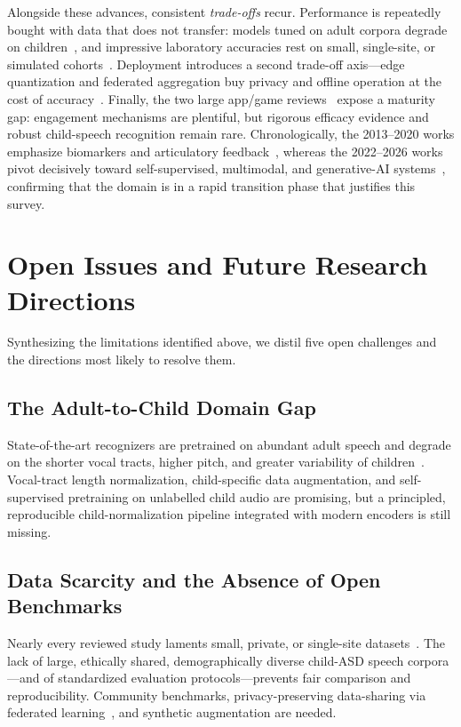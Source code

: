 \documentclass[conference]{IEEEtran}
\begin{document}
Alongside these advances, consistent \emph{trade-offs} recur. Performance is repeatedly bought with data that does not transfer: models tuned on adult corpora degrade on children~\cite{ref1}, and impressive laboratory accuracies rest on small, single-site, or simulated cohorts~\cite{ref6,ref10,ref11}. Deployment introduces a second trade-off axis---edge quantization and federated aggregation buy privacy and offline operation at the cost of accuracy~\cite{ref23,ref24}. Finally, the two large app/game reviews~\cite{ref12,ref13} expose a maturity gap: engagement mechanisms are plentiful, but rigorous efficacy evidence and robust child-speech recognition remain rare. Chronologically, the 2013--2020 works emphasize biomarkers and articulatory feedback~\cite{ref8,ref16,ref6}, whereas the 2022--2026 works pivot decisively toward self-supervised, multimodal, and generative-AI systems~\cite{ref3,ref10,ref11,ref15}, confirming that the domain is in a rapid transition phase that justifies this survey.

\section{Open Issues and Future Research Directions}
\label{sec:future}
Synthesizing the limitations identified above, we distil five open challenges and the directions most likely to resolve them.

\subsection{The Adult-to-Child Domain Gap}
State-of-the-art recognizers are pretrained on abundant adult speech and degrade on the shorter vocal tracts, higher pitch, and greater variability of children~\cite{ref1,ref2}. Vocal-tract length normalization, child-specific data augmentation, and self-supervised pretraining on unlabelled child audio are promising, but a principled, reproducible child-normalization pipeline integrated with modern encoders is still missing.

\subsection{Data Scarcity and the Absence of Open Benchmarks}
Nearly every reviewed study laments small, private, or single-site datasets~\cite{ref3,ref6,ref10,ref19}. The lack of large, ethically shared, demographically diverse child-ASD speech corpora---and of standardized evaluation protocols---prevents fair comparison and reproducibility. Community benchmarks, privacy-preserving data-sharing via federated learning~\cite{ref24}, and synthetic augmentation are needed.
\end{document}
